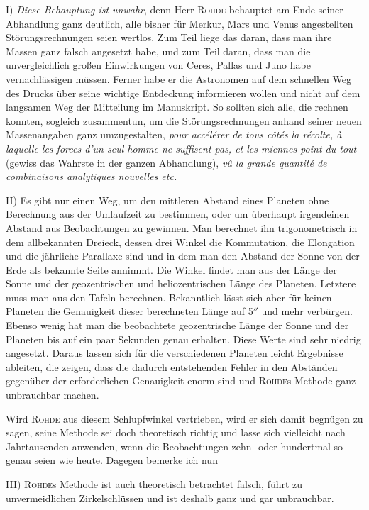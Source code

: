 \noindent I) \emph{Diese Behauptung ist unwahr}, denn Herr \textsc{Rohde} behauptet am Ende seiner Abhandlung ganz deutlich, alle bisher für Merkur, Mars und Venus angestellten Störungsrechnungen seien wertlos. Zum Teil liege das daran, dass man ihre Massen ganz falsch angesetzt habe, und zum Teil daran, dass man die unvergleichlich großen Einwirkungen von Ceres, Pallas und Juno habe vernachlässigen müssen. Ferner habe er die Astronomen auf dem schnellen Weg des Drucks über seine wichtige Entdeckung informieren wollen und nicht auf dem langsamen Weg der Mitteilung im Manuskript. So sollten sich alle, die rechnen konnten, sogleich zusammentun, um die Störungsrechnungen anhand seiner neuen Massenangaben ganz umzugestalten, \emph{pour accélérer de tous côtés la récolte, à laquelle les forces d'un seul homme ne suffisent pas, et les miennes point du tout} (gewiss das Wahrste in der ganzen Abhandlung), \emph{vû la grande quantité de combinaisons analytiques nouvelles etc.}

\noindent II) Es gibt nur einen Weg, um den mittleren Abstand eines Planeten ohne Berechnung aus der Umlaufzeit zu bestimmen, oder um überhaupt irgendeinen Abstand aus Beobachtungen zu gewinnen. Man berechnet ihn trigonometrisch in dem allbekannten Dreieck, dessen drei Winkel die Kommutation, die Elongation und die jährliche Parallaxe sind und in dem man den Abstand der Sonne von der Erde als bekannte Seite annimmt. Die Winkel findet man aus der Länge der Sonne und der geozentrischen und heliozentrischen Länge des Planeten. Letztere muss man aus den Tafeln berechnen. Bekanntlich lässt sich aber für keinen Planeten die Genauigkeit dieser berechneten Länge auf 5$''$ und mehr verbürgen. Ebenso wenig hat man die beobachtete geozentrische Länge der Sonne und der Planeten bis auf ein paar Sekunden genau erhalten. Diese Werte sind sehr niedrig angesetzt. Daraus lassen sich für die verschiedenen Planeten leicht Ergebnisse ableiten, die zeigen, dass die dadurch entstehenden Fehler in den Abständen gegenüber der erforderlichen Genauigkeit enorm sind und \textsc{Rohde}s Methode ganz unbrauchbar machen.

Wird \textsc{Rohde} aus diesem Schlupfwinkel vertrieben, wird er sich damit begnügen zu sagen, seine Methode sei doch theoretisch richtig und lasse sich vielleicht nach Jahrtausenden anwenden, wenn die Beobachtungen zehn- oder hundertmal so genau seien wie heute. Dagegen bemerke ich nun

III) \textsc{Rohde}s Methode ist auch theoretisch betrachtet falsch, führt zu unvermeidlichen Zirkelschlüssen und ist deshalb ganz und gar unbrauchbar.

